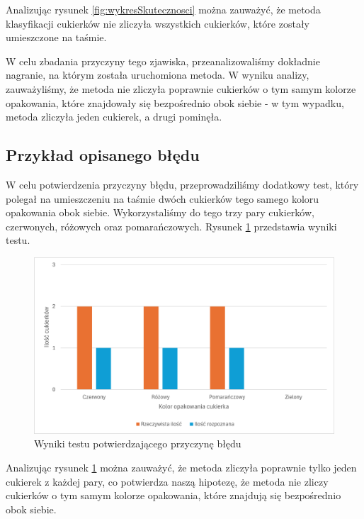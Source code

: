 \documentclass{article}
\begin{document}
Analizując rysunek \ref{fig:wykresSkutecznosci} można zauważyć, że metoda klasyfikacji cukierków nie zliczyła wszystkich cukierków, które zostały umieszczone na taśmie.

W celu zbadania przyczyny tego zjawiska, przeanalizowaliśmy dokładnie nagranie, na którym została uruchomiona metoda. W wyniku analizy, zauważyliśmy, że metoda nie zliczyła poprawnie cukierków o tym samym kolorze opakowania, które znajdowały się bezpośrednio obok siebie - w tym wypadku, metoda zliczyła jeden cukierek, a drugi pominęła.

\subsection{Przykład opisanego błędu}
\label{Przykład opisanego błędu}
W celu potwierdzenia przyczyny błędu, przeprowadziliśmy dodatkowy test, który polegał na umieszczeniu na taśmie dwóch cukierków tego samego koloru opakowania obok siebie. Wykorzystaliśmy do tego trzy pary cukierków, czerwonych, różowych oraz pomarańczowych. Rysunek \ref{fig:wykresBledu} przedstawia wyniki testu.

\begin{figure}[H]
    \centering
    \includegraphics{wykresBledu}
    \caption{Wyniki testu potwierdzającego przyczynę błędu}
    \label{fig:wykresBledu}
\end{figure}

Analizując rysunek \ref{fig:wykresBledu} można zauważyć, że metoda zliczyła poprawnie tylko jeden cukierek z każdej pary, co potwierdza naszą hipotezę, że metoda nie zliczy cukierków o tym samym kolorze opakowania, które znajdują się bezpośrednio obok siebie.
\end{document}
